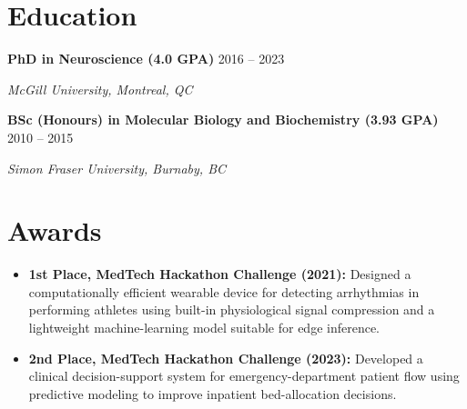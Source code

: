 \documentclass[letterpaper,10pt]{article}
\newcommand{\role}[3]{\textbf{#1} \hfill #3\par\textit{#2}\par}
\begin{document}
\section{Education}
\role{PhD in Neuroscience (4.0 GPA)}{McGill University, Montreal, QC}{2016 -- 2023}
\role{BSc (Honours) in Molecular Biology and Biochemistry (3.93 GPA)}{Simon Fraser University, Burnaby, BC}{2010 -- 2015}

\section{Awards}
\begin{itemize}
    \item \textbf{1st Place, MedTech Hackathon Challenge (2021):} Designed a computationally efficient wearable device for detecting arrhythmias in performing athletes using built-in physiological signal compression and a lightweight machine-learning model suitable for edge inference.
    \item \textbf{2nd Place, MedTech Hackathon Challenge (2023):} Developed a clinical decision-support system for emergency-department patient flow using predictive modeling to improve inpatient bed-allocation decisions.
\end{itemize}
\end{document}
